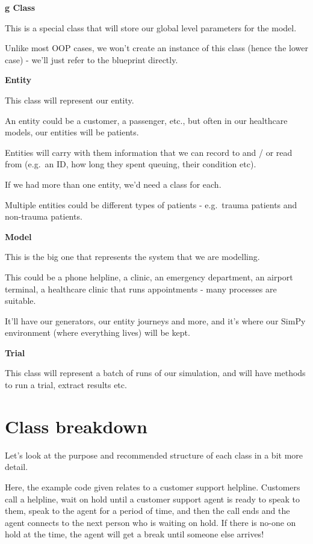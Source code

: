 \documentclass[
  letterpaper,
  DIV=11,
  numbers=noendperiod]{scrreprt}
\begin{document}
\textbf{g Class}

This is a special class that will store our global level parameters for
the model.

Unlike most OOP cases, we won't create an instance of this class (hence
the lower case) - we'll just refer to the blueprint directly.

\textbf{Entity}

This class will represent our entity.

An entity could be a customer, a passenger, etc., but often in our
healthcare models, our entities will be patients.

Entities will carry with them information that we can record to and / or
read from (e.g.~an ID, how long they spent queuing, their condition
etc).

If we had more than one entity, we'd need a class for each.

Multiple entities could be different types of patients - e.g.~trauma
patients and non-trauma patients.

\textbf{Model}

This is the big one that represents the system that we are modelling.

This could be a phone helpline, a clinic, an emergency department, an
airport terminal, a healthcare clinic that runs appointments - many
processes are suitable.

It'll have our generators, our entity journeys and more, and it's where
our SimPy environment (where everything lives) will be kept.

\textbf{Trial}

This class will represent a batch of runs of our simulation, and will
have methods to run a trial, extract results etc.

\section{Class breakdown}\label{class-breakdown}

Let's look at the purpose and recommended structure of each class in a
bit more detail.

Here, the example code given relates to a customer support helpline.
Customers call a helpline, wait on hold until a customer support agent
is ready to speak to them, speak to the agent for a period of time, and
then the call ends and the agent connects to the next person who is
waiting on hold. If there is no-one on hold at the time, the agent will
get a break until someone else arrives!
\end{document}
